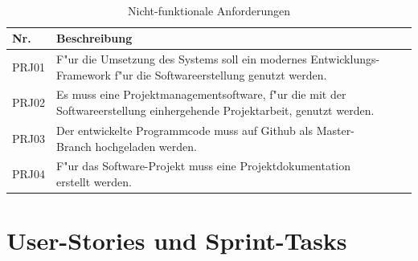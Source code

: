 \documentclass[a4paper, 11pt]{scrreprt}
\begin{document}
\begin{table}[H]

\caption{Nicht-funktionale Anforderungen}

\ \\

\par

\label{tab:Tabelle3}

\centering

\begin{tabular}{|p{2.5cm} p{12cm}| ll}

\hline
Nr. &	Beschreibung\\

\hline
PRJ01 &	F"ur die Umsetzung des Systems soll ein modernes Entwicklungs-Framework f"ur die Softwareerstellung genutzt werden.\\

\hline
PRJ02 &	Es muss eine Projektmanagementsoftware, f"ur die mit der Softwareerstellung einhergehende Projektarbeit, genutzt werden.\\

\hline
PRJ03 &	Der entwickelte Programmcode muss auf Github als Master-Branch hochgeladen werden.\\

\hline
PRJ04 &	F"ur das Software-Projekt muss eine Projektdokumentation erstellt werden.\\

\hline
\end{tabular}

\end{table}

\section{User-Stories und Sprint-Tasks}
\end{document}
